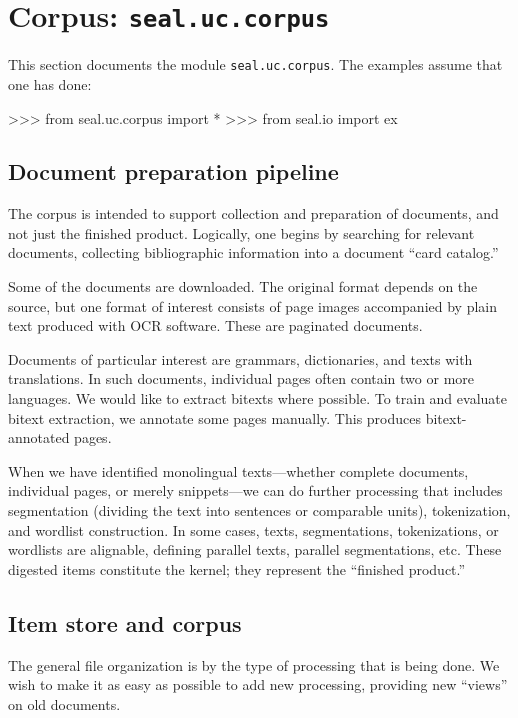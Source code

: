 
\chapter{Corpus: {\tt seal.uc.corpus}}\label{chap3}

This section documents the module {\tt seal.uc.corpus}.  The examples
assume that one has done:
\begin{python}
>>> from seal.uc.corpus import *
>>> from seal.io import ex
\end{python}


\section{Document preparation pipeline}

The corpus is intended to support collection and preparation of
documents, and not just the finished product.  Logically, one begins
by searching for relevant documents, collecting bibliographic
information into a document ``card catalog.''

Some of the documents are downloaded.
The original format depends on the source, but one format
of interest consists of page images accompanied by plain text produced
with OCR software.  These are paginated documents.

Documents of particular interest are grammars, dictionaries, and texts
with translations.  In such documents, individual pages often contain
two or more languages.  We would like to extract bitexts where
possible.  To train and evaluate bitext extraction, we annotate some
pages manually.  This produces bitext-annotated pages.

When we have identified monolingual texts---whether complete
documents, individual pages, or merely snippets---we can do further
processing that includes segmentation (dividing the text into
sentences or comparable units), tokenization, and wordlist
construction.  In some cases, texts, segmentations, tokenizations, or
wordlists are alignable, defining parallel texts, parallel
segmentations, etc.  These digested items constitute the
{\df kernel}; they represent the ``finished product.''

\section{Item store and corpus}

The general file organization is by the type of processing that is
being done.  We wish to make it as easy as possible to add new
processing, providing new ``views'' on old documents.

